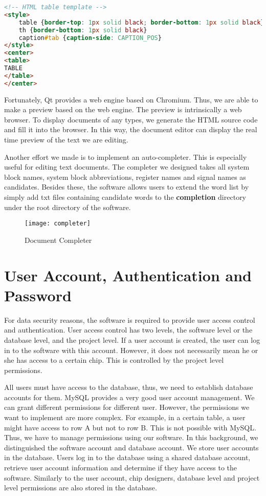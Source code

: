 \begin{lstlisting}[language=html]
<!-- HTML table template -->
<style>
    table {border-top: 1px solid black; border-bottom: 1px solid black}
    th {border-bottom: 1px solid black}
    caption#tab {caption-side: CAPTION_POS}
</style>
<center>
<table>
TABLE
</table>
</center>
\end{lstlisting}

Fortunately, Qt provides a web engine based on Chromium. Thus, we are able to make a preview based on the web engine. The preview is intrinsically a web browser. To display documents of any types, we generate the HTML source code and fill it into the browser. In this way, the document editor can display the real time preview of the text we are editing.

Another effort we made is to implement an auto-completer. This is especially useful for editing text documents. The completer we designed takes all system block names, system block abbreviations, register names and signal names as candidates. Besides these, the software allows users to extend the word list by simply add txt files containing candidate words to the \textbf{completion} directory under the root directory of the software.

\begin{figure}[htbp]
\centering
\texttt{[image: completer]}
\caption{Document Completer\label{fig:Document Completer}}
\end{figure} 

\section{User Account, Authentication and Password}
For data security reasons, the software is required to provide user access control and authentication. User access control has two levels, the software level or the database level, and the project level. If a user account is created, the user can log in to the software with this account. However, it does not necessarily mean he or she has access to a certain chip. This is controlled by the project level permissions.

All users must have access to the database, thus, we need to establish database accounts for them. MySQL provides a very good user account management. We can grant different permissions for different user. However, the permissions we want to implement are more complex. For example, in a certain table, a user might have access to row A but not to row B. This is not possible with MySQL. Thus, we have to manage permissions using our software. In this background, we distinguished the software account and database account. We store user accounts in the database. Users log in to the database using a shared database account, retrieve user account information and determine if they have access to the software. Similarly to the user account, chip designers, database level and project level permissions are also stored in the database.

